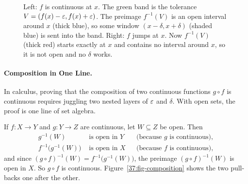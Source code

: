 \begin{figure}[htbp]
\caption{Left: $f$ is continuous at $x$. The green band is the tolerance $V = (f(x) - \varepsilon, f(x) + \varepsilon)$. The preimage $f^{-1}(V)$ is an open interval around $x$ (thick blue), so some window $(x - \delta, x + \delta)$ (shaded blue) is sent into the band. Right: $f$ jumps at $x$. Now $f^{-1}(V)$ (thick red) starts exactly at $x$ and contains no interval around $x$, so it is not open and no $\delta$ works.}\label{37:fig-eps-delta-band}
\end{figure}

\paragraph{Composition in One Line.}
In calculus, proving that the composition of two continuous functions $g \circ f$ is continuous requires juggling two nested layers of $\varepsilon$ and $\delta$. With open sets, the proof is one line of set algebra.

If $f\colon X \to Y$ and $g\colon Y \to Z$ are continuous, let $W \subseteq Z$ be open. Then
\begin{align*}
g^{-1}(W) &\text{ is open in } Y && \text{(because $g$ is continuous)},\\
f^{-1}\bigl(g^{-1}(W)\bigr) &\text{ is open in } X && \text{(because $f$ is continuous)},
\end{align*}
and since $(g \circ f)^{-1}(W) = f^{-1}\bigl(g^{-1}(W)\bigr)$, the preimage $(g \circ f)^{-1}(W)$ is open in $X$. So $g \circ f$ is continuous. Figure~\ref{37:fig-composition} shows the two pull-backs one after the other.

